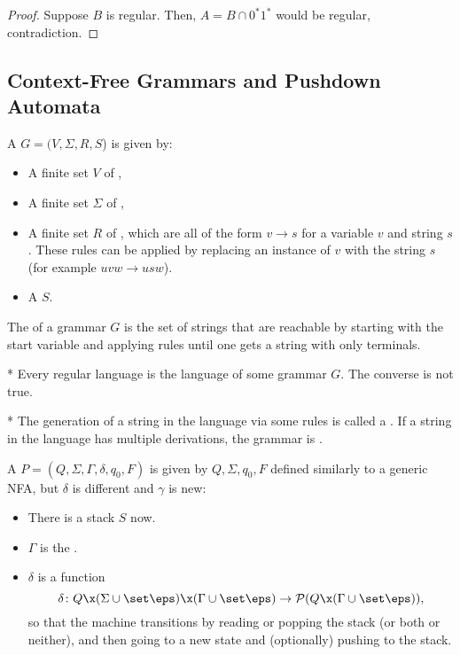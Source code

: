 \begin{proof}
	Suppose $B$ is regular.
	Then, $A = B \cap 0^*1^*$ would be regular, contradiction.
\end{proof}

\subsection{Context-Free Grammars and Pushdown Automata}

\begin{defn}
	A  $G = (V,\Sigma, R, S$) is given by:
	\begin{itemize}
		\item A finite set $V$ of ,
		\item A finite set $\Sigma$ of , 
		\item A finite set $R$ of , which are all of the form $v\to s$ for a variable $v$ and string $s$. These rules can be applied by replacing an instance of $v$ with the string $s$ (for example $uvw \to usw$).
		\item A  $S$.
	\end{itemize}
	The  of a grammar $G$ is the set of strings that are reachable by starting with the start variable and applying rules until one gets a string with only terminals. 
\end{defn}

\begin{fact}*
	Every regular language is the language of some grammar $G$. The converse is not true.
\end{fact}

\begin{defn}*
	The generation of a string in the language via some rules is called a . If a string in the language has multiple derivations, the grammar is .
\end{defn}

\begin{defn}
	A  $P = (Q,\Sigma, \Gamma, \delta, q_0, F)$ is given by $Q,\Sigma,q_0,F$ defined similarly to a generic NFA, but $\delta$ is different and $\gamma$ is new:
	\begin{itemize}
		\item There is a stack $S$ now.
		\item $\Gamma$ is the . 
		\item $\delta$ is a function \[
				\delta \colon Q\x (\Sigma \cup \set \eps) \x (\Gamma \cup \set \eps) \to \mathcal P(Q\x (\Gamma\cup\set \eps)),
			\]
			so that the machine transitions by reading or popping the stack (or both or neither), and then going to a new state and (optionally) pushing to the stack.
	\end{itemize}
\end{defn}
